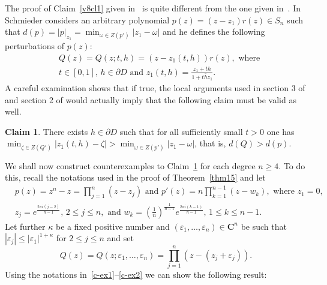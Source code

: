 \documentclass[10pt,twoside,a4paper,reqno]{amsart}
\theoremstyle{plain}
\theoremstyle{definition}
\newtheorem{claim}   {Claim}
\begin{document}
{The proof of Claim~\ref{v8cl1} given in~\cite[v6-v7]{S1} is quite different 
from the one given in~\cite[v8]{S1}. In~\cite[v6-v7]{S1} Schmieder considers 
an arbitrary polynomial $p(z)=(z-z_1)r(z)\in S_n$ such that 
$d(p)=|p|_{z_1}=\min_{\omega\in Z(p')}|z_1-\omega|$ and he defines the 
following perturbations of $p(z)$:
\begin{equation*}
\begin{split}
&Q(z)=Q(z;t,h)=\left(z-z_1(t,h)\right)r(z),\text{ where}\\
&t\in [0,1],\,h\in \partial D
\text{ and } z_1(t,h)=\frac{z_1+th}{1+t\bar{h}z_1}.
\end{split}
\end{equation*}
A careful examination shows that if true, the local arguments used in section 
3 of \cite[v6]{S1} and section 2 of \cite[v7]{S1} would actually imply that 
the following claim must be valid as well.

\begin{claim}\label{v67cl}
There exists $h\in \partial D$ such that for all sufficiently small $t>0$ one 
has 
$\min_{\zeta\in Z(Q')}|z_1(t,h)-\zeta|>\min_{\omega\in Z(p')}|z_1-\omega|$, 
that is, $d(Q)>d(p)$.
\end{claim}

We shall now construct counterexamples to Claim~\ref{v67cl} for each degree 
$n\ge 4$. To do this, recall the notations used in the proof of 
Theorem~\ref{thm15} and let
\begin{equation}\label{c-ex1}
\begin{split}
&p(z)=z^n-z=\prod_{j=1}^{n}(z-z_j)\text{ and }
p'(z)=n\prod_{k=1}^{n-1}(z-w_k),\text{ where }z_{1}=0,\\
&z_{j}=e^{\frac{2\pi i(j-2)}{n-1}},\,2\le j\le n, 
\text{ and } w_{k}=\left(\!\frac{1}{n}\!\right)^{\!\frac{1}{n-1}}\!
e^{\frac{2\pi i(k-1)}{n-1}},\,1\le k\le n-1.
\end{split}
\end{equation}
Let further $\kappa$ be a fixed positive number and 
$(\varepsilon_1,\ldots,\varepsilon_n)\in \mathbf{C}^n$ be such 
that $|\varepsilon_j|\le |\varepsilon_1|^{1+\kappa}$ for $2\le j\le n$ and set
\begin{equation}\label{c-ex2}
Q(z)=Q(z;\varepsilon_1,\ldots,\varepsilon_n)
=\prod_{j=1}^{n}(z-(z_j+\varepsilon_j)).
\end{equation}
Using the notations in~\eqref{c-ex1}--\eqref{c-ex2} we can show the following 
result:

}
\end{document}
